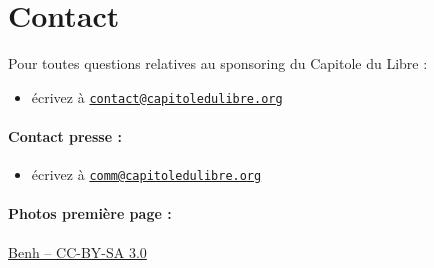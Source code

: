 \documentclass{cdl_sponsor}
\begin{document}
\section{Contact}

Pour toutes questions relatives au sponsoring du Capitole du Libre :
\begin{itemize}
\item[\logo] écrivez à \href{mailto:contact@capitoledulibre.org}{\nolinkurl{contact@capitoledulibre.org}}
\end{itemize}
\paragraph{Contact presse :}
\begin{itemize}
\item[\logo] écrivez à \href{mailto:comm@capitoledulibre.org}{\nolinkurl{comm@capitoledulibre.org}}
\end{itemize}

\paragraph{Photos première page  :} \href{https://commons.wikimedia.org/wiki/File\%3AToulouse_Capitole_Night_Wikimedia_Commons.jpg}{Benh  -- CC-BY-SA 3.0}
\end{document}
